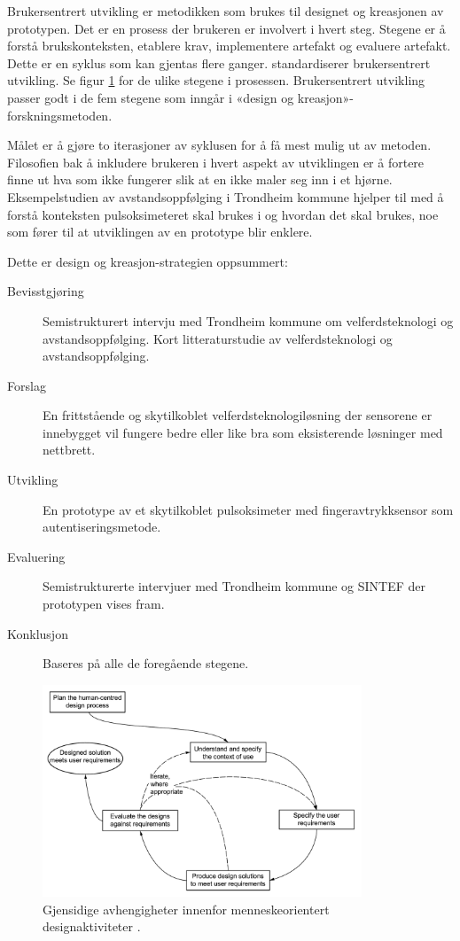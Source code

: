 Brukersentrert utvikling er metodikken som brukes til designet og kreasjonen av prototypen. Det er en prosess der brukeren er involvert i hvert steg.
Stegene er å forstå brukskonteksten, etablere krav, implementere artefakt og evaluere artefakt. Dette er en syklus som kan gjentas flere ganger.
\citet{dis20099241} standardiserer brukersentrert utvikling. Se figur \ref{fig:iso9241-210}
for de ulike stegene i prosessen.
Brukersentrert utvikling passer godt i de fem stegene som inngår i «design og kreasjon»-forskningsmetoden.

Målet er å gjøre to iterasjoner av syklusen for å få mest mulig ut av metoden. Filosofien bak å inkludere brukeren i hvert aspekt av utviklingen er å fortere
finne ut hva som ikke fungerer slik at en ikke maler seg inn i et hjørne. Eksempelstudien av avstandsoppfølging i Trondheim kommune
hjelper til med å forstå konteksten pulsoksimeteret skal brukes i og hvordan det skal brukes, noe som fører til at utviklingen av en prototype blir enklere.

\begin{minipage}{\linewidth}
Dette er design og kreasjon-strategien oppsummert:\newline

\begin{description}
  \item [Bevisstgjøring] Semistrukturert intervju med Trondheim kommune om velferdsteknologi og avstandsoppfølging. Kort litteraturstudie av velferdsteknologi
      og avstandsoppfølging.
  \item [Forslag] En frittstående og skytilkoblet velferdsteknologiløsning der sensorene er innebygget vil fungere bedre
      eller like bra som eksisterende løsninger med nettbrett.
  \item [Utvikling] En prototype av et skytilkoblet pulsoksimeter med fingeravtrykksensor som autentiseringsmetode.
  \item [Evaluering] Semistrukturerte intervjuer med Trondheim kommune og SINTEF der prototypen vises fram.
  \item [Konklusjon] Baseres på alle de foregående stegene.
\end{description}
\end{minipage}

\begin{figure}
\centering
\includegraphics[width=0.85\textwidth]{fig/iso9241-210}
\caption{Gjensidige avhengigheter innenfor menneskeorientert designaktiviteter \citep{dis20099241}.}
\label{fig:iso9241-210}
\end{figure}

